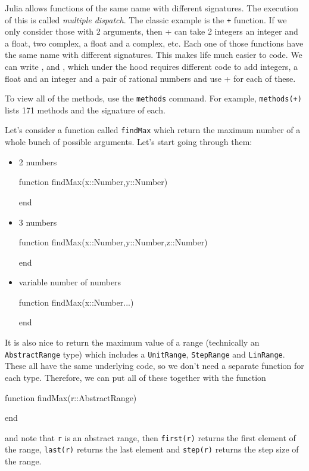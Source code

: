 Julia allows functions of the same name with different signatures. The execution of this is called \emph{multiple dispatch}. The classic example is the \texttt{+} function. If we only consider those with 2 arguments, then + can take 2 integers an integer and a float, two complex, a float and a complex, etc. Each one of those functions have the same name with different signatures.  This makes life much easier to code.  We can write ,  and , which under the hood requires different code to add integers, a float and an integer and a pair of rational numbers and use + for each of these. 

To view all of the methods, use the \texttt{methods} command. For example, \texttt{methods(+)} lists 171 methods and the signature of each.

Let's consider a function called \verb!findMax! which return the
maximum number of a whole bunch of possible arguments. Let's start going
through them:

\begin{itemize}
\item 2 numbers
%
\begin{jlblock}[adf]
function findMax(x::Number,y::Number)

end
\end{jlblock}

\item 3 numbers 
%
\begin{jlblock}[adf]
function findMax(x::Number,y::Number,z::Number)

end
\end{jlblock}

\item variable number of numbers 
\begin{jlblock}[adf]
function findMax(x::Number...)

end
\end{jlblock}
\end{itemize}

It is also nice to return the maximum value of a range (technically an
\texttt{AbstractRange} type) which includes a \texttt{UnitRange},
\texttt{StepRange} and \texttt{LinRange}.  These all have the same underlying code, so we don't need a separate function for each type.  Therefore, we can put all of these together with the function
%
\begin{jlverbatim}[adf]
function findMax(r::AbstractRange)

end
\end{jlverbatim}
%
and note that \texttt{r} is an abstract range, then \texttt{first(r)}
returns the first element of the range, \texttt{last(r)} returns the
last element and \texttt{step(r)} returns the step size of the range.


